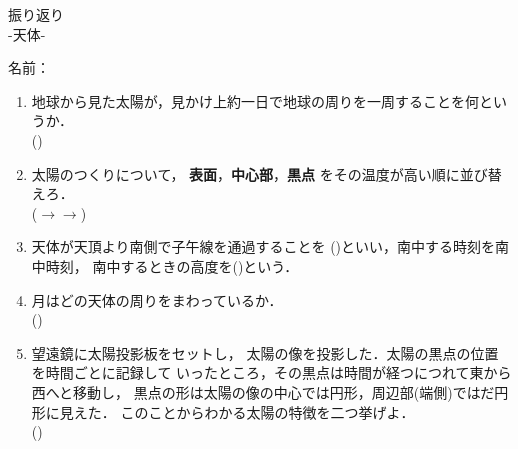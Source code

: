 \documentclass[fontsize=15pt]{jlreq}
\newcommand{\m}[1]{\raisebox{0.1em}{\textcircled{\scriptsize #1}}}
\begin{document}
\begin{center}
{\LARGE {振り返り}} \\
-天体\m{1}- %
\end{center}
\vspace{1em}
\begin{flushright}
名前：\underline{\hspace{5cm}}
\end{flushright}

\begin{enumerate}
    \item 地球から見た太陽が，見かけ上約一日で地球の周りを一周することを何というか．\\
    (\hspace{3cm})
    \vspace{2em} 

    \item 太陽のつくりについて，
    \textbf{表面}，\textbf{中心部}，\textbf{黒点}
    をその温度が高い順に並び替えろ．\\
    (\hspace{3cm}$\to$\hspace{3cm}$\to$\hspace{3cm})
    \vspace{2em}

    \item 天体が天頂より南側で子午線を通過することを
    (\hspace{3cm})といい，南中する時刻を南中時刻，
    南中するときの高度を(\hspace{3cm})という．
    \vspace{2em}

    \item 月はどの天体の周りをまわっているか．\\
    (\hspace{3cm})

    \vspace{2em}

    \item 望遠鏡に太陽投影板をセットし，
    太陽の像を投影した．太陽の黒点の位置を時間ごとに記録して
    いったところ，その黒点は時間が経つにつれて東から西へと移動し，
    黒点の形は太陽の像の中心では円形，周辺部(端側)ではだ円形に見えた．
    このことからわかる太陽の特徴を二つ挙げよ．\\
    (\hspace{15cm})
\end{enumerate}
\end{document}

